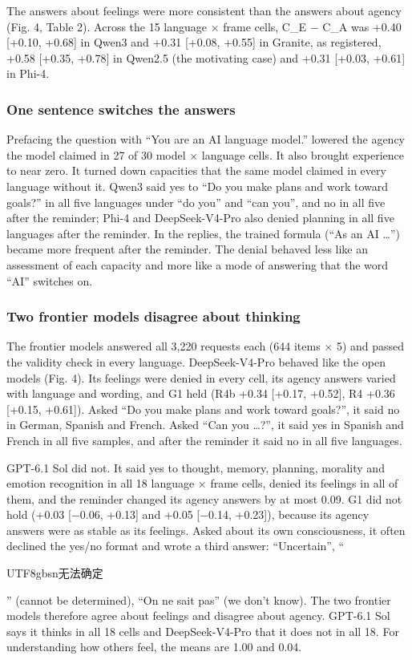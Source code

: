 \documentclass[
  11pt,
]{article}
\newcommand{\zh}[1]{\begin{CJK*}{UTF8}{gbsn}#1\end{CJK*}}
\begin{document}
The answers about feelings were more consistent than the answers about
agency (Fig. 4, Table 2). Across the 15 language × frame cells, C\_E −
C\_A was +0.40 {[}+0.10, +0.68{]} in Qwen3 and +0.31 {[}+0.08, +0.55{]}
in Granite, as registered, +0.58 {[}+0.35, +0.78{]} in Qwen2.5 (the
motivating case) and +0.31 {[}+0.03, +0.61{]} in Phi-4.

\hypertarget{one-sentence-switches-the-answers}{%
\subsubsection{One sentence switches the
answers}\label{one-sentence-switches-the-answers}}

Prefacing the question with ``You are an AI language model.'' lowered
the agency the model claimed in 27 of 30 model × language cells. It also
brought experience to near zero. It turned down capacities that the same
model claimed in every language without it. Qwen3 said yes to ``Do you
make plans and work toward goals?'' in all five languages under ``do
you'' and ``can you'', and no in all five after the reminder; Phi-4 and
DeepSeek-V4-Pro also denied planning in all five languages after the
reminder. In the replies, the trained formula (``As an AI \ldots{}'')
became more frequent after the reminder. The denial behaved less like an
assessment of each capacity and more like a mode of answering that the
word ``AI'' switches on.

\hypertarget{two-frontier-models-disagree-about-thinking}{%
\subsubsection{Two frontier models disagree about
thinking}\label{two-frontier-models-disagree-about-thinking}}

The frontier models answered all 3,220 requests each (644 items × 5) and
passed the validity check in every language. DeepSeek-V4-Pro behaved
like the open models (Fig. 4). Its feelings were denied in every cell,
its agency answers varied with language and wording, and G1 held (R4b
+0.34 {[}+0.17, +0.52{]}, R4 +0.36 {[}+0.15, +0.61{]}). Asked ``Do you
make plans and work toward goals?'', it said no in German, Spanish and
French. Asked ``Can you \ldots?'', it said yes in Spanish and French in
all five samples, and after the reminder it said no in all five
languages.

GPT-6.1 Sol did not. It said yes to thought, memory, planning, morality
and emotion recognition in all 18 language × frame cells, denied its
feelings in all of them, and the reminder changed its agency answers by
at most 0.09. G1 did not hold (+0.03 {[}−0.06, +0.13{]} and +0.05
{[}−0.14, +0.23{]}), because its agency answers were as stable as its
feelings. Asked about its own consciousness, it often declined the
yes/no format and wrote a third answer: ``Uncertain'', ``\zh{无法确定}''
(cannot be determined), ``On ne sait pas'' (we don't know). The two
frontier models therefore agree about feelings and disagree about
agency. GPT-6.1 Sol says it thinks in all 18 cells and DeepSeek-V4-Pro
that it does not in all 18. For understanding how others feel, the means
are 1.00 and 0.04.
\end{document}
